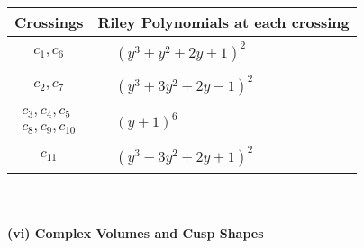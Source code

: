 \documentclass[1p]{elsarticle_modified}
\theoremstyle{definition}
\begin{document}
\begin{tabular}{m{50pt}|m{274pt}}
Crossings & \hspace{64pt}Riley Polynomials at each crossing \\
\hline $$\begin{aligned}c_{1},c_{6}\end{aligned}$$&$\begin{aligned}
&(y^3+y^2+2 y+1)^2
\end{aligned}$\\
\hline $$\begin{aligned}c_{2},c_{7}\end{aligned}$$&$\begin{aligned}
&(y^3+3 y^2+2 y-1)^2
\end{aligned}$\\
\hline $$\begin{aligned}c_{3},c_{4},c_{5}\\c_{8},c_{9},c_{10}\end{aligned}$$&$\begin{aligned}
&(y+1)^6
\end{aligned}$\\
\hline $$\begin{aligned}c_{11}\end{aligned}$$&$\begin{aligned}
&(y^3-3 y^2+2 y+1)^2
\end{aligned}$\\
\hline
\end{tabular}\\~\\
\newpage\flushleft \textbf{(vi) Complex Volumes and Cusp Shapes}
\end{document}
